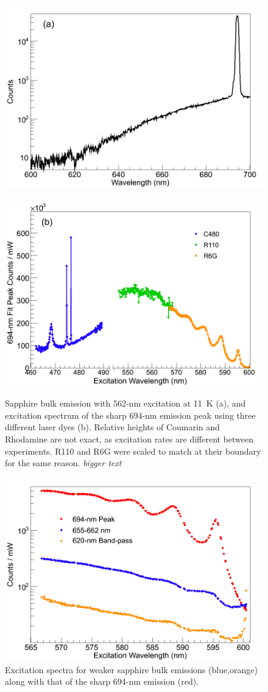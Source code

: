 \begin{figure} %
        \centering
                \includegraphics[width=.5\textwidth]{figures/Cr_a.png}
                ~
                \includegraphics[width=.5\textwidth]{figures/Cr_b.png}
                \caption{Sapphire bulk emission with 562-nm excitation at 11~K (a), and excitation spectrum of the sharp 694-nm emission peak using three different laser dyes (b).  Relative heights of Coumarin and Rhodamine are not exact, as excitation rates are different between experiments.  R110 and R6G were scaled to match at their boundary for the same reason. \emph{\color{gray}bigger text}}
\label{fig:Cr}
\end{figure}

\begin{figure} %
        \centering
                \includegraphics[width=.7\textwidth]{figures/Cr_broad.png}
                \caption{Excitation spectra for weaker sapphire bulk emissions (blue,orange) along with that of the sharp 694-nm emission (red).}
        \label{fig:CrBroad}
\end{figure}

